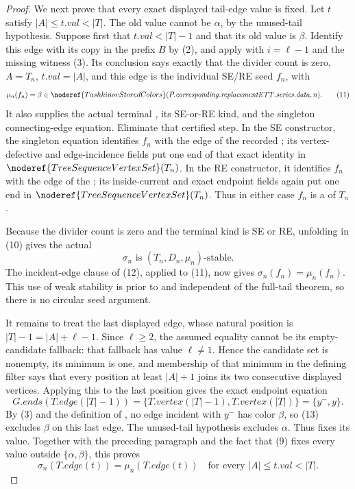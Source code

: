 \begin{proof}
We next prove that every exact displayed tail-edge value is fixed.  Let
\(t\) satisfy \(|A|\leq t.\mathit{val}<|T|\).  The old value cannot be
\(\alpha\), by the unused-tail hypothesis.  Suppose first that
\(t.\mathit{val}<|T|-1\) and that its old value is \(\beta\).  Identify
this edge with its copy in the prefix \(B\) by (2), and apply
 with \(i=\ell-1\) and the
missing witness (3).  Its conclusion says exactly that the divider count
is zero, \(A=T_n\), \(t.\mathit{val}=|A|\), and this edge is the individual
SE/RE seed \(f_n\), with
\[
 \mu_n(f_n)=\beta\in
 \noderef{TashkinovStoredColors}(P.\mathit{corresponding}.
             \mathit{replacementETT}.\mathit{series}.\mathit{data},n).
                                                                    \tag{11}
\]
It also supplies the actual terminal
, its SE-or-RE kind, and the singleton
connecting-edge equation.  Eliminate that certified step.  In the SE
constructor, the singleton equation identifies \(f_n\) with the edge of
the recorded ; its vertex-defective and
edge-incidence fields put one end of that exact identity in
\(\noderef{TreeSequenceVertexSet}(T_n)\).
In the RE constructor, it identifies \(f_n\) with the edge of the
; its inside-current and exact
endpoint fields again put one end in
\(\noderef{TreeSequenceVertexSet}(T_n)\).  Thus in either case
\(f_n\) is a  of \(T_n\).

Because the divider count is zero and the terminal kind is SE or RE,
unfolding  in (10) gives the actual
\[
       \sigma_n\text{ is }(T_n,D_n,\mu_n)\text{-stable}.       \tag{12}
\]
The incident-edge clause of (12), applied to (11), now gives
\(\sigma_n(f_n)=\mu_n(f_n)\).  This use of weak stability is prior to and
independent of the full-tail theorem, so there is no circular seed
argument.

It remains to treat the last displayed edge, whose natural position is
\(|T|-1=|A|+\ell-1\).  Since \(\ell\geq2\), the assumed
 equality cannot be its empty-candidate
fallback: that fallback has value \(\ell\ne1\).  Hence the candidate set
is nonempty, its minimum is one, and membership of that minimum in the
defining filter says that every position at least \(|A|+1\) joins its two
consecutive displayed vertices.  Applying this to the last position gives
the exact endpoint equation
\[
 G.\mathit{ends}(T.\mathit{edge}(|T|-1))
       =\{T.\mathit{vertex}(|T|-1),T.\mathit{vertex}(|T|)\}
       =\{y^-,y\}.                                             \tag{13}
\]
By (3) and the definition of , no edge incident
with \(y^-\) has color \(\beta\), so (13) excludes \(\beta\) on this last
edge.  The unused-tail hypothesis excludes \(\alpha\).  Thus
 fixes its value.  Together with the
preceding paragraph and the fact that (9) fixes every value outside
\(\{\alpha,\beta\}\), this proves
\[
 \sigma_n(T.\mathit{edge}(t))=\mu_n(T.\mathit{edge}(t))
       \quad\text{for every }|A|\leq t.\mathit{val}<|T|.       \tag{14}
\]


\end{proof}
